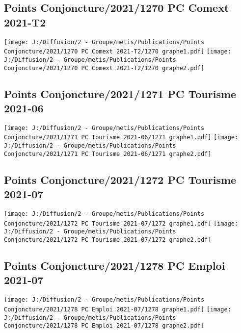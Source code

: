 \documentclass[
]{article}
\begin{document}
\hypertarget{points-conjoncture20211270-pc-comext-2021-t2}{%
\subsection{Points Conjoncture/2021/1270 PC Comext
2021-T2}\label{points-conjoncture20211270-pc-comext-2021-t2}}

\texttt{[image: J:/Diffusion/2 - Groupe/metis/Publications/Points Conjoncture/2021/1270 PC Comext 2021-T2/1270 graphe1.pdf]}
\texttt{[image: J:/Diffusion/2 - Groupe/metis/Publications/Points Conjoncture/2021/1270 PC Comext 2021-T2/1270 graphe2.pdf]}

\hypertarget{points-conjoncture20211271-pc-tourisme-2021-06}{%
\subsection{Points Conjoncture/2021/1271 PC Tourisme
2021-06}\label{points-conjoncture20211271-pc-tourisme-2021-06}}

\texttt{[image: J:/Diffusion/2 - Groupe/metis/Publications/Points Conjoncture/2021/1271 PC Tourisme 2021-06/1271 graphe1.pdf]}
\texttt{[image: J:/Diffusion/2 - Groupe/metis/Publications/Points Conjoncture/2021/1271 PC Tourisme 2021-06/1271 graphe2.pdf]}

\hypertarget{points-conjoncture20211272-pc-tourisme-2021-07}{%
\subsection{Points Conjoncture/2021/1272 PC Tourisme
2021-07}\label{points-conjoncture20211272-pc-tourisme-2021-07}}

\texttt{[image: J:/Diffusion/2 - Groupe/metis/Publications/Points Conjoncture/2021/1272 PC Tourisme 2021-07/1272 graphe1.pdf]}
\texttt{[image: J:/Diffusion/2 - Groupe/metis/Publications/Points Conjoncture/2021/1272 PC Tourisme 2021-07/1272 graphe2.pdf]}

\hypertarget{points-conjoncture20211278-pc-emploi-2021-07}{%
\subsection{Points Conjoncture/2021/1278 PC Emploi
2021-07}\label{points-conjoncture20211278-pc-emploi-2021-07}}

\texttt{[image: J:/Diffusion/2 - Groupe/metis/Publications/Points Conjoncture/2021/1278 PC Emploi 2021-07/1278 graphe1.pdf]}
\texttt{[image: J:/Diffusion/2 - Groupe/metis/Publications/Points Conjoncture/2021/1278 PC Emploi 2021-07/1278 graphe2.pdf]}
\end{document}
